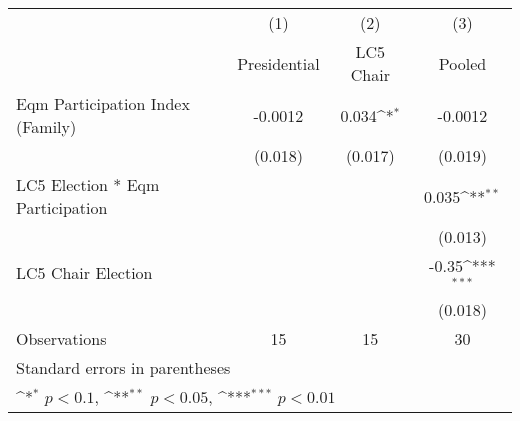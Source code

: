 {
\def\sym#1{\ifmmode^{#1}\else\(^{#1}\)\fi}
\begin{tabular}{l*{3}{c}}
\toprule
                &\multicolumn{1}{c}{(1)}&\multicolumn{1}{c}{(2)}&\multicolumn{1}{c}{(3)}\\
                &\multicolumn{1}{c}{Presidential}&\multicolumn{1}{c}{LC5 Chair}&\multicolumn{1}{c}{Pooled}\\
\midrule
Eqm Participation Index (Family)&  -0.0012         &    0.034\sym{*}  &  -0.0012         \\
                &  (0.018)         &  (0.017)         &  (0.019)         \\
LC5 Election * Eqm Participation&                  &                  &    0.035\sym{**} \\
                &                  &                  &  (0.013)         \\
LC5 Chair Election&                  &                  &    -0.35\sym{***}\\
                &                  &                  &  (0.018)         \\
\midrule
Observations    &       15         &       15         &       30         \\
\bottomrule
\multicolumn{4}{l}{\footnotesize Standard errors in parentheses}\\
\multicolumn{4}{l}{\footnotesize \sym{*} \(p<0.1\), \sym{**} \(p<0.05\), \sym{***} \(p<0.01\)}\\
\end{tabular}
}
